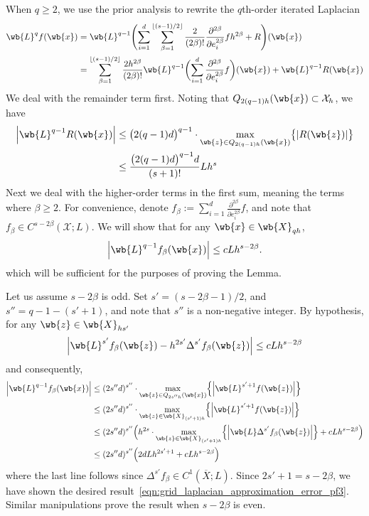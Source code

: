 \documentclass{article}
\newcommand{\abs}[1]{\left \lvert #1 \right \rvert}
\newcommand{\floor}[1]{\left\lfloor #1 \right\rfloor}
\newcommand{\1}{\mathbf{1}}
\newcommand{\Xset}{\mathcal{X}}
\newcommand{\ol}[1]{\overline{#1}}
\theoremstyle{alden}
\theoremstyle{aldenthm}
\theoremstyle{definition}
\theoremstyle{remark}
\begin{document}
When $q \geq 2$, we use the prior analysis to rewrite the $q$th-order iterated Laplacian
\begin{align}
\wb{L}^qf(\wb{x}) & = \wb{L}^{q - 1} \Biggl(\sum_{i = 1}^d \sum_{\beta = 1}^{\floor{(s - 1)/2}} \frac{2}{(2\beta)!} \frac{\partial^{2\beta}}{\partial e_i^{2\beta}} f h^{2 \beta} + R\Biggr)(\wb{x}) \nonumber \\
& = \sum_{\beta = 1}^{\floor{(s - 1)/2}} \frac{2h^{2\beta}}{(2\beta)!} \wb{L}^{q - 1} \biggl(\sum_{i = 1}^d\frac{\partial^{2\beta}}{\partial e_i^{2\beta}} f \biggr)(\wb{x}) + \wb{L}^{q - 1}R(\wb{x}) \label{eqn:grid_laplacian_approximation_error_pf5}
\end{align}
We deal with the remainder term first. Noting that $Q_{2(q - 1)h}(\wb{x}) \subset \Xset_{h}$, we have
\begin{align}
\abs{\wb{L}^{q - 1}R(\wb{x})} & \leq \bigl(2(q - 1)d\bigr)^{q - 1} \cdot \max_{\wb{z} \in Q_{2(q - 1)h}(\wb{x})} \bigl\{\abs{R(\wb{z})}\bigr\} \nonumber \\
& \leq \frac{\bigl(2(q - 1)d\bigr)^{q - 1}d}{(s + 1)!} L h^s \label{eqn:grid_laplacian_approximation_error_pf2}
\end{align}
Next we deal with the higher-order terms in the first sum, meaning the terms where $\beta \geq 2$. For convenience, denote $f_\beta := \sum_{i = 1}^d\frac{\partial^{2\beta}}{\partial e_i^{2\beta}} f$, and note that $f_{\beta} \in C^{s - 2\beta}(\Xset;L)$.  We will show that for any $\wb{x} \in \wb{X}_{qh}$,
\begin{equation}
\label{eqn:grid_laplacian_approximation_error_pf3}
\abs{\wb{L}^{q - 1}f_{\beta}(\wb{x})} \leq c L h^{s - 2\beta}.
\end{equation}
which will be sufficient for the purposes of proving the Lemma. 

Let us assume $s - 2\beta$ is odd. Set $s' = (s - 2\beta - 1)/2$, and $s'' = q - 1 - (s' + 1)$, and note that $s''$ is a non-negative integer. By hypothesis, for any $\wb{z} \in \wb{X}_{hs'}$
\begin{equation*}
\abs{\wb{L}^{s'}f_{\beta}(\wb{z}) - h^{2s'}\Delta^{s'}f_{\beta}(\wb{z})} \leq cLh^{s - 2\beta}
\end{equation*}
and consequently,
\begin{align*}
\abs{\wb{L}^{q - 1}f_{\beta}(\wb{x})} & \leq (2s''d)^{s''} \cdot \max_{\wb{z} \in Q_{2s''h}(\wb{x})} \Bigl\{\abs{\wb{L}^{s' + 1}f(\wb{z})}\Bigr\} \\
& \leq (2s''d)^{s''} \cdot \max_{\wb{z} \in \wb{X}_{(s' + 1)h}} \Bigl\{\abs{\wb{L}^{s' + 1}f(\wb{z})}\Bigr\}  \\
& \leq (2s''d)^{s''} \Bigl( h^{2s} \cdot \max_{\wb{z} \in \wb{X}_{(s' + 1)h}} \Bigl\{ \abs{\wb{L} \Delta^{s'} f_{\beta}(\wb{z})} \Bigr\} + cLh^{s - 2\beta}\Bigr) \\
& \leq (2s''d)^{s''} \Bigl( 2dL h^{2s' + 1}  + cLh^{s - 2\beta}\Bigr)
\end{align*}
where the last line follows since $\Delta^{s'}{f_{\beta}} \in C^1(\ol{X};L)$. Since $2s' + 1 = s - 2\beta$, we have shown the desired result~\eqref{eqn:grid_laplacian_approximation_error_pf3}. Similar manipulations prove the result when $s - 2\beta$ is even. 
\end{document}
